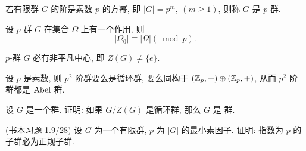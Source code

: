 \begin{definition}\label{p-群}
	若有限群 $G$ 的阶是素数 $p$ 的方幂, 即 $|G|=p^m,\ (m\geqslant 1)$, 则称 $G$ 是 $p$-群.
\end{definition}

\begin{proposition}
	设 $p$-群 $G$ 在集合 $\Omega$ 上有一个作用, 则
	$$|\Omega_0|\equiv|\Omega|(\bmod p).$$
\end{proposition}

\begin{corollary}
	$p$-群 $G$ 必有非平凡中心, 即 $Z(G)\neq \{e\}$.
\end{corollary}

\begin{corollary}
	设 $p$ 是素数, 则 $p^2$ 阶群要么是循环群, 要么同构于 $(\mathbb {Z}_{p},+)\oplus(\mathbb {Z}_{p},+)$, 从而 $p^2$ 阶群都是 $\text {Abel}$ 群.
\end{corollary}

\begin{practice}\label{prac:群作用}
	\problem 设 $G$ 是一个群. 证明: 如果 $G/Z(G)$ 是循环群, 那么 $G$ 是 \Abel 群.

	\problem\label{prac:群作用2}(书本习题 1.9/28) 设 $G$ 为一个有限群, $p$ 为 $|G|$ 的最小素因子. 证明: 指数为 $p$ 的子群必为正规子群.
\end{practice}